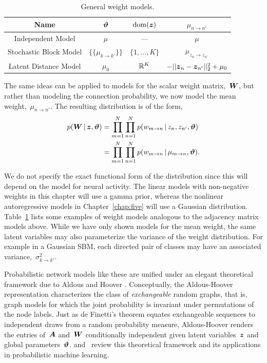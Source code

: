 \begin{table}
\begin{center}
\begin{tabular}{c|c|c|c}
Name & $\boldsymbol{\vartheta}$ & $\mathrm{dom}(\boldsymbol{z})$ & $\mu_{n \to n'}$ \\
\hline
Independent Model & $\mu$ & --- & $\mu$ \\
Stochastic Block Model & $\{\{ \mu_{k \to k'} \}\}$ & $\{1, \ldots, K\}$ & $\mu_{z_n \to z_{n'}}$ \\
Latent Distance Model & $\mu_0$ & $\mathbb{R}^K$ & $-||\boldsymbol{z}_n - \boldsymbol{z}_{n'}||_2^2 + \mu_0$ 
\end{tabular}
\end{center}
\caption{General weight models.}
\label{tab:W_models}
\end{table}

The same ideas can be applied to models for the scalar weight matrix,~$\boldsymbol{W}$,
but rather than modeling the connection probability, we now model the
mean weight,~$\mu_{n \to n'}$. The resulting distribution is of the form,
\begin{align*}
  p(\boldsymbol{W} \,|\, \boldsymbol{z}, \boldsymbol{\vartheta})
  &= \prod_{m=1}^N \prod_{n=1}^N p(w_{m \to n} \,|\, z_n, z_{n'}, \boldsymbol{\vartheta}) \\
  &= \prod_{m=1}^N \prod_{n=1}^N p(w_{m \to n} \,|\, \mu_{m \to n}, \boldsymbol{\vartheta}).
\end{align*}

We do not specify the exact functional form of the distribution since
this will depend on the model for neural activity. The linear
models with non-negative weights in this chapter will use a gamma
prior, whereas the nonlinear autoregressive models in Chapter~\ref{chap:five} will use a Gaussian
distribution. Table~\ref{tab:W_models} lists some examples of weight
models analogous to the adjacency matrix models above.
While we have only shown models for the mean weight,
the same latent variables may
also parameterize the variance of the weight distribution. For example
in a Gaussian SBM, each directed pair of classes may have an
associated variance,~$\sigma^2_{k \to k'}$.

Probabilistic network models like these are unified under an elegant
theoretical framework due to Aldous and Hoover
\citep{Aldous-1981,Hoover-1979}. Conceptually, the Aldous-Hoover
representation characterizes the class of \textit{exchangeable} random
graphs, that is, graph models for which the joint probability is
invariant under permutations of the node labels. Just as de Finetti's
theorem equates exchangeable sequences to independent draws from a
random probability measure, Aldous-Hoover renders the entries of~$\boldsymbol{A}$ and~$\boldsymbol{W}$ conditionally
independent given latent variables~$\boldsymbol{z}$ and global
parameters~$\boldsymbol{\vartheta}$. \citet{Lloyd-2012} and~\citet{orbanz2015bayesian}
review this theoretical framework and its applications in
probabilistic machine learning.

